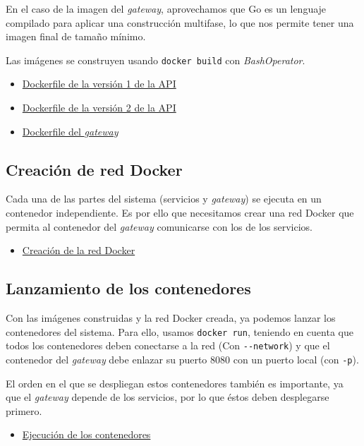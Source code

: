 En el caso de la imagen del \textit{gateway}, aprovechamos que Go es un
lenguaje compilado para aplicar una construcción multifase, lo que nos permite
tener una imagen final de tamaño mínimo.

Las imágenes se construyen usando \lstinline{docker build} con \textit{BashOperator}.

\begin{itemize}
    \item\href{
        https://github.com/Varrrro/forecast/blob/master/src/v1/Dockerfile
    }{Dockerfile de la versión 1 de la API}
    \item\href{
        https://github.com/Varrrro/forecast/blob/master/src/v2/Dockerfile
    }{Dockerfile de la versión 2 de la API}
    \item\href{
        https://github.com/Varrrro/forecast/blob/master/src/gateway/Dockerfile
    }{Dockerfile del \textit{gateway}}
\end{itemize}

\subsection{Creación de red Docker}
Cada una de las partes del sistema (servicios y \textit{gateway}) se ejecuta
en un contenedor independiente. Es por ello que necesitamos crear una red
Docker que permita al contenedor del \textit{gateway} comunicarse con los
de los servicios.

\begin{itemize}
    \item\href{
        https://github.com/Varrrro/forecast/blob/master/airflow/tasks.py#L182-L187
    }{Creación de la red Docker}
\end{itemize}

\subsection{Lanzamiento de los contenedores}
Con las imágenes construidas y la red Docker creada, ya podemos lanzar los
contenedores del sistema. Para ello, usamos \lstinline{docker run}, teniendo
en cuenta que todos los contenedores deben conectarse a la red (Con
\lstinline{--network}) y que el contenedor del \textit{gateway} debe enlazar
su puerto 8080 con un puerto local (con \lstinline{-p}).

El orden en el que se despliegan estos contenedores también es importante,
ya que el \textit{gateway} depende de los servicios, por lo que éstos deben
desplegarse primero.

\begin{itemize}
    \item\href{
        https://github.com/Varrrro/forecast/blob/master/airflow/tasks.py#L189-L208
    }{Ejecución de los contenedores}
\end{itemize}
